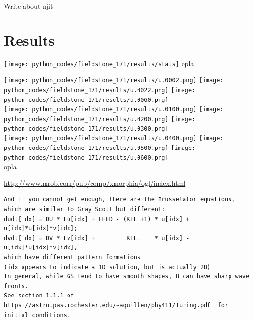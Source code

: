 Write about njit

\newpage
\section*{Results}

\begin{center}
\texttt{[image: python\_codes/fieldstone\_171/results/stats]}
{\captionfont opla}
\end{center}

\begin{center}
\texttt{[image: python\_codes/fieldstone\_171/results/u.0002.png]}
\texttt{[image: python\_codes/fieldstone\_171/results/u.0022.png]}
\texttt{[image: python\_codes/fieldstone\_171/results/u.0060.png]}\\
\texttt{[image: python\_codes/fieldstone\_171/results/u.0100.png]}
\texttt{[image: python\_codes/fieldstone\_171/results/u.0200.png]}
\texttt{[image: python\_codes/fieldstone\_171/results/u.0300.png]}\\
\texttt{[image: python\_codes/fieldstone\_171/results/u.0400.png]}
\texttt{[image: python\_codes/fieldstone\_171/results/u.0500.png]}
\texttt{[image: python\_codes/fieldstone\_171/results/u.0600.png]}\\
{\captionfont opla}
\end{center}










\url{
http://www.mrob.com/pub/comp/xmorphia/ogl/index.html
}


\begin{verbatim}
And if you cannot get enough, there are the Brusselator equations, which are similar to Gray Scott but different:
dudt[idx] = DU * Lu[idx] + FEED - (KILL+1) * u[idx] + u[idx]*u[idx]*v[idx];
dvdt[idx] = DV * Lv[idx] +         KILL    * u[idx] - u[idx]*u[idx]*v[idx];
which have different pattern formations
(idx appears to indicate a 1D solution, but is actually 2D)
In general, while GS tend to have smooth shapes, B can have sharp wave fronts.
See section 1.1.1 of https://astro.pas.rochester.edu/~aquillen/phy411/Turing.pdf  for initial conditions.
\end{verbatim}




